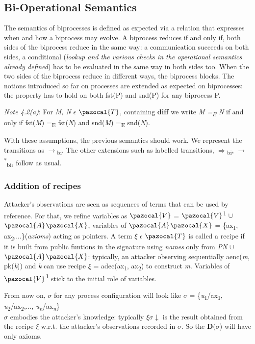\documentclass[11pt]{article}
\newcommand{\Ta}{\pazocal{T}}
\newcommand{\Aa}{\pazocal{A}}
\newcommand{\Xa}{\pazocal{X}}
\newcommand{\Va}{\pazocal{V}}
\begin{document}
\subsection{Bi-Operational Semantics}
The semantics of biprocesses is defined as expected via a relation that expresses when and how a biprocess may evolve. A biprocess reduces if and only if, both sides of the biprocess reduce in the same way: a communication succeeds on both sides, a conditional ({\it lookup and the various checks in the operational semantics already defined}) has to be evaluated in the same way in both sides too. When the two sides of the biprocess reduce in different ways, the biprocess blocks. The notions introduced so far on processes are extended as expected on biprocesses: the property has to hold on both fst(P) and snd(P) for any biprocess P.\newline

{\it Note 4.2(a)}: For {\it M, N} $\epsilon$ $\Ta$, containing {\bf diff} we write {\it M =\textsubscript{E} N} if and only if fst({\it M}) =\textsubscript{E} fst({\it N}) and snd({\it M}) =\textsubscript{E} snd({\it N}). \newline

With these assumptions, the previous semantics should work. We represent the transitions as {$\rightarrow$}\textsubscript{bi}. The other extensions such as labelled transitions, {$\Rightarrow$}\textsubscript{bi}, {$\rightarrow$}\textsuperscript{*}\textsubscript{bi}, follow as usual.

\subsubsection{Addition of recipes}
Attacker’s  observations  are  seen  as  sequences  of  terms that can be used by reference. For that, we refine variables as $\Va$ = $\Va$\textsuperscript{1} $\cup$ $\Aa$$\Xa$,  variables  of $\Aa$$\Xa$ = \{ax\textsubscript{1}, ax\textsubscript{2},...\}({\it axioms}) acting as pointers. A term $\xi$ $\epsilon$ $\Ta$ is called a recipe if it is built from public funtions in the signature using {\it names} only from {\it PN} $\cup$ $\Aa$$\Xa$: typically, an attacker observing sequentially aenc({\it m}, pk({\it k})) and {\it k} can use recipe $\xi$ = adec(ax\textsubscript{1}, ax\textsubscript{2}) to construct {\it m}. Variables of $\Va$\textsuperscript{1} stick to the  initial  role  of  variables.\newline

\vspace{-12pt}
\hspace*{8pt}From now on, $\sigma$ for any process configuration will look like $\sigma$ = \{{\it u}\textsubscript{1}/ax\textsubscript{1}, {\it u}\textsubscript{2}/ax\textsubscript{2},..., {\it u}\textsubscript{{\it n}}/ax\textsubscript{{\it n}}\}\\ 
$\sigma$ embodies the attacker’s knowledge:  typically $\xi$$\sigma$$\downarrow$ is the result obtained from the recipe $\xi$ w.r.t. the attacker’s observations recorded in $\sigma$. So the {\bf D}($\sigma$) will have only axioms.
\end{document}
